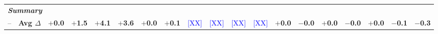 \begin{table}[t]
\begin{tabular}{llccccccccccccccccc}
\midrule
\multicolumn{19}{l}{\textit{\textbf{Summary}}} \\
-- & \textbf{Avg $\Delta$} & \textbf{$+$0.0} & \textbf{$+$1.5} & \textbf{$+$4.1} & \textbf{$+$3.6} & \textbf{$+$0.0} & \textbf{$+$0.1} & \textcolor{blue}{[XX]} & \textcolor{blue}{[XX]} & \textcolor{blue}{[XX]} & \textcolor{blue}{[XX]} & \textbf{$+$0.0} & \textbf{$-$0.0} & \textbf{$+$0.0} & \textbf{$-$0.0} & \textbf{$+$0.0} & \textbf{$-$0.1} & \textbf{$-$0.3} \\
\bottomrule
\end{tabular}
\end{table}